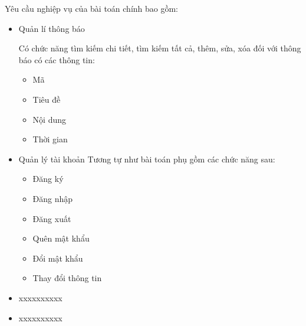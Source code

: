 Yêu cầu nghiệp vụ của bài toán chính bao gồm:

\begin{itemize}

    \item Quản lí thông báo

          Có chức năng tìm kiếm chi tiết, tìm kiếm tất cả, thêm, sửa, xóa đối với  thông báo có các thông tin:

          \begin{itemize}

              \item Mã

              \item Tiêu đề

              \item Nội dung

              \item  Thời gian

          \end{itemize}
    \item Quản lý tài khoản
          Tương tự  như bài toán phụ gồm các chức năng sau:

          \begin{itemize}

              \item Đăng ký

              \item Đăng nhập

              \item Đăng xuất

              \item Quên mật khẩu

              \item Đổi mật khẩu

              \item Thay đổi thông tin

          \end{itemize}
    \item xxxxxxxxxx
    \item xxxxxxxxxx

\end{itemize}







